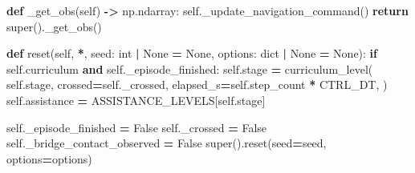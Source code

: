\documentclass[
  american,
  11pt,
  letterpaper,
]{article}
\newenvironment{Shaded}{\begin{snugshade}}{\end{snugshade}}
\newcommand{\BuiltInTok}[1]{#1}
\newcommand{\ControlFlowTok}[1]{\textcolor[rgb]{0.13,0.29,0.53}{\textbf{#1}}}
\newcommand{\KeywordTok}[1]{\textcolor[rgb]{0.13,0.29,0.53}{\textbf{#1}}}
\newcommand{\NormalTok}[1]{#1}
\newcommand{\OperatorTok}[1]{\textcolor[rgb]{0.81,0.36,0.00}{\textbf{#1}}}
\newcommand{\VariableTok}[1]{\textcolor[rgb]{0.00,0.00,0.00}{#1}}
\renewenvironment{Shaded}{\par\smallskip}{\par\smallskip}
\begin{document}
\begin{Shaded}
\begin{Highlighting}[]
    \KeywordTok{def}\NormalTok{ \_get\_obs(}\VariableTok{self}\NormalTok{) }\OperatorTok{{-}\textgreater{}}\NormalTok{ np.ndarray:}
        \VariableTok{self}\NormalTok{.\_update\_navigation\_command()}
        \ControlFlowTok{return} \BuiltInTok{super}\NormalTok{().\_get\_obs()}

    \KeywordTok{def}\NormalTok{ reset(}\VariableTok{self}\NormalTok{, }\OperatorTok{*}\NormalTok{, seed: }\BuiltInTok{int} \OperatorTok{|} \VariableTok{None} \OperatorTok{=} \VariableTok{None}\NormalTok{, options: }\BuiltInTok{dict} \OperatorTok{|} \VariableTok{None} \OperatorTok{=} \VariableTok{None}\NormalTok{):}
        \ControlFlowTok{if} \VariableTok{self}\NormalTok{.curriculum }\KeywordTok{and} \VariableTok{self}\NormalTok{.\_episode\_finished:}
            \VariableTok{self}\NormalTok{.stage }\OperatorTok{=}\NormalTok{ curriculum\_level(}
                \VariableTok{self}\NormalTok{.stage,}
\NormalTok{                crossed}\OperatorTok{=}\VariableTok{self}\NormalTok{.\_crossed,}
\NormalTok{                elapsed\_s}\OperatorTok{=}\VariableTok{self}\NormalTok{.step\_count }\OperatorTok{*}\NormalTok{ CTRL\_DT,}
\NormalTok{            )}
            \VariableTok{self}\NormalTok{.assistance }\OperatorTok{=}\NormalTok{ ASSISTANCE\_LEVELS[}\VariableTok{self}\NormalTok{.stage]}

        \VariableTok{self}\NormalTok{.\_episode\_finished }\OperatorTok{=} \VariableTok{False}
        \VariableTok{self}\NormalTok{.\_crossed }\OperatorTok{=} \VariableTok{False}
        \VariableTok{self}\NormalTok{.\_bridge\_contact\_observed }\OperatorTok{=} \VariableTok{False}
        \BuiltInTok{super}\NormalTok{().reset(seed}\OperatorTok{=}\NormalTok{seed, options}\OperatorTok{=}\NormalTok{options)}


\end{Highlighting}
\end{Shaded}
\end{document}
